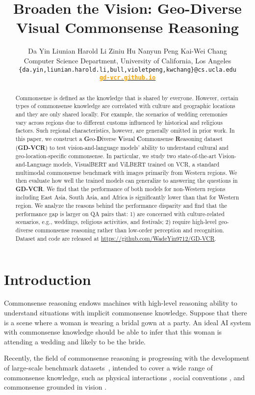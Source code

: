 \documentclass[11pt]{article}
\title{Broaden the Vision: Geo-Diverse Visual Commonsense Reasoning}
\author{
	Da Yin 
\quad	Liunian Harold Li
\quad	Ziniu Hu 
\quad	Nanyun Peng
\quad	Kai-Wei Chang \\
	Computer Science Department, University of California, Los Angeles\\
	{\tt \{da.yin,liunian.harold.li,bull,violetpeng,kwchang\}@cs.ucla.edu}
	\\
	{\tt \href{gd-vcr.github.io}{\textbf{\textcolor{orange}{gd-vcr.github.io}}}}
	\\
}
\begin{document}
\maketitle
\begin{abstract}
Commonsense is defined as the knowledge that is shared by everyone. 
However, certain types of commonsense knowledge are correlated with culture and geographic locations and they are only shared locally. For example, the scenarios of wedding ceremonies vary across regions due to different customs influenced by historical and religious factors. Such regional characteristics, however, are generally omitted in prior work. 
In this paper, we construct a \textbf{G}eo-\textbf{D}iverse \textbf{V}isual \textbf{C}ommonsense \textbf{R}easoning dataset (\textbf{GD-VCR}) to test vision-and-language models' ability to understand cultural and geo-location-specific commonsense. 
In particular, we study two state-of-the-art Vision-and-Language models, VisualBERT and ViLBERT trained on VCR, a standard multimodal commonsense benchmark with images primarily from Western regions. We then evaluate how well the trained models can generalize to answering the questions in \textbf{GD-VCR}. We find that the performance of both models for non-Western regions including East Asia, South Asia, and Africa is significantly lower than that for Western region.
We analyze the reasons behind the performance disparity and find that the performance gap is larger on QA pairs that: 1) are concerned with culture-related scenarios, e.g., weddings, religious activities, and festivals; 2) require high-level geo-diverse commonsense reasoning rather than low-order perception and recognition. Dataset and code are released at \url{https://github.com/WadeYin9712/GD-VCR}.
\end{abstract}

\section{Introduction}
Commonsense reasoning endows machines with high-level reasoning ability to understand situations with implicit commonsense knowledge. 
Suppose that there is a scene where a woman is wearing a bridal gown at a party. An ideal AI system with commonsense knowledge should be able to infer that this woman is attending a wedding and likely to be the bride.

Recently, the field of commonsense reasoning is progressing with the development of large-scale benchmark datasets~\cite{zellers-etal-2018-swag,talmor-etal-2019-commonsenseqa}, intended to cover a wide range of commonsense knowledge, such as physical interactions \cite{Bisk2020}, social conventions \cite{sap-etal-2019-social}, and commonsense grounded in vision \cite{zellers2019vcr}.
\end{document}
